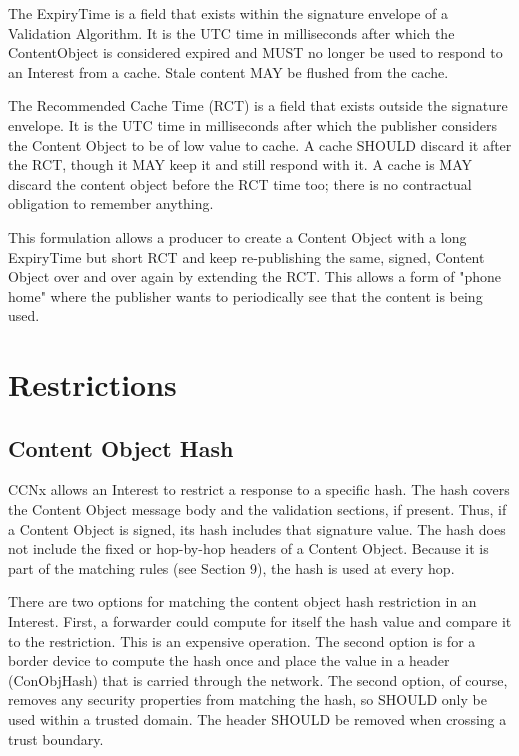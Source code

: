 \documentclass[12pt]{report}
\begin{document}
The ExpiryTime is a field that exists within the signature envelope
of a Validation Algorithm.  It is the UTC time in milliseconds after
which the ContentObject is considered expired and MUST no longer be
used to respond to an Interest from a cache.  Stale content MAY be
flushed from the cache.

The Recommended Cache Time (RCT) is a field that exists outside the
signature envelope.  It is the UTC time in milliseconds after which
the publisher considers the Content Object to be of low value to
cache.  A cache SHOULD discard it after the RCT, though it MAY keep
it and still respond with it.  A cache is MAY discard the content
object before the RCT time too; there is no contractual obligation to
remember anything.

This formulation allows a producer to create a Content Object with a
long ExpiryTime but short RCT and keep re-publishing the same,
signed, Content Object over and over again by extending the RCT.
This allows a form of "phone home" where the publisher wants to
periodically see that the content is being used.

\section{Restrictions}

\subsection{Content Object Hash}
CCNx allows an Interest to restrict a response to a specific hash.
The hash covers the Content Object message body and the validation
sections, if present.  Thus, if a Content Object is signed, its hash
includes that signature value.  The hash does not include the fixed
or hop-by-hop headers of a Content Object.  Because it is part of the
matching rules (see Section 9), the hash is used at every hop.

There are two options for matching the content object hash
restriction in an Interest.  First, a forwarder could compute for
itself the hash value and compare it to the restriction.  This is an
expensive operation.  The second option is for a border device to
compute the hash once and place the value in a header (ConObjHash)
that is carried through the network.  The second option, of course,
removes any security properties from matching the hash, so SHOULD
only be used within a trusted domain.  The header SHOULD be removed
when crossing a trust boundary.
\end{document}
